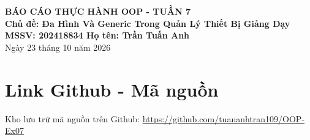 \documentclass[11pt,a4paper]{article}
\begin{document}
\begin{center}
    {\LARGE \textbf{BÁO CÁO THỰC HÀNH OOP - TUẦN 7}}\\[0.2cm]
    {\large \textbf{Chủ đề: Đa Hình Và Generic Trong Quản Lý Thiết Bị Giảng Dạy}}\\[0.35cm]
    \textbf{MSSV: 202418834 \quad Họ tên: Trần Tuấn Anh}\\[0.2cm]
    Ngày 23 tháng 10 năm 2026
\end{center}

\vspace{0.15cm}

\section{Link Github - Mã nguồn}
Kho lưu trữ mã nguồn trên Github: \url{https://github.com/tuananhtran109/OOP-Ex07}
\end{document}
